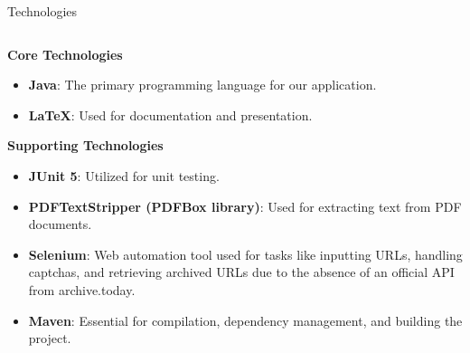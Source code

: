 \documentclass[
    ngerman,%
    authorontitle=true,
]{bfhbeamer}
\begin{document}
    \begin{frame}{Technologies}
        \begin{columns}
            \begin{column}{0.7\textwidth}
                \textbf{Core Technologies}
                \begin{itemize}
                    \item \textbf{Java}: The primary programming language for our application.
                    \item \textbf{LaTeX}: Used for documentation and presentation.
                \end{itemize}

                \vspace{1em} %

                \textbf{Supporting Technologies}
                \begin{itemize}
                    \item \textbf{JUnit 5}: Utilized for unit testing.
                    \item \textbf{PDFTextStripper (PDFBox library)}: Used for extracting text from PDF documents.
                    \item \textbf{Selenium}: Web automation tool used for tasks like inputting URLs, handling captchas, and retrieving archived URLs due to the absence of an official API from archive.today.
                    \item \textbf{Maven}: Essential for compilation, dependency management, and building the project.
                \end{itemize}
            \end{column}


\end{columns}
\end{frame}
\end{document}
